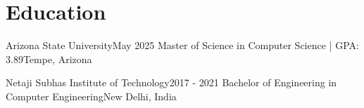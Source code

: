 \section{Education}
    \resumeSubHeadingListStart

    \resumeSubheading
    {Arizona State University}{May 2025\textit{}}
    {Master of Science in Computer Science | GPA: 3.89}{Tempe, Arizona}
    \resumeItemListStart
    \resumeItemListEnd

    \resumeSubheading
    {Netaji Subhas Institute of Technology}{2017 - 2021}
    {Bachelor of Engineering in Computer Engineering}{New Delhi, India}
    \resumeSubHeadingListEnd